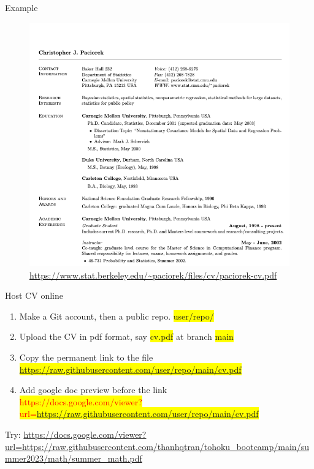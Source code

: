 \documentclass[
11pt, %
]{beamer}
\newcommand{\red}[1]{\textcolor{red}{#1}}
\begin{document}
	\begin{frame}{Example}
		\begin{figure}[ht]
			\includegraphics[scale=0.3]{cv_example.png}
			\caption{\tiny \url{https://www.stat.berkeley.edu/~paciorek/files/cv/paciorek-cv.pdf} }
		\end{figure}
	\end{frame}
	
	\begin{frame}{Host CV online}
		\begin{enumerate}
			\item Make a Git account, then a public repo. \colorbox{yellow}{user/repo/}
			\item Upload the CV in pdf format, say \colorbox{yellow}{cv.pdf} at branch \colorbox{yellow}{main}
			\item Copy the permanent link to the file \\
			 \colorbox{yellow}{\url{https://raw.githubusercontent.com/user/repo/main/cv.pdf}}
			\item Add google doc preview before the link \\
			\tiny \colorbox{yellow}{\red{https://docs.google.com/viewer?url=}\url{https://raw.githubusercontent.com/user/repo/main/cv.pdf}}
		\end{enumerate}
		Try: \url{https://docs.google.com/viewer?url=https://raw.githubusercontent.com/thanhqtran/tohoku_bootcamp/main/summer2023/math/summer_math.pdf}
	\end{frame}
	
\end{document}

